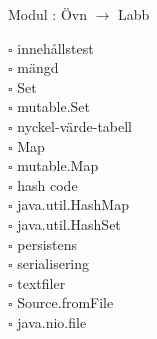 
    Modul : Övn  $\rightarrow$ Labb 
    \begin{multicols}{3}\SlideFontTiny
    $\square$ innehållstest \\
$\square$ mängd \\
$\square$ Set \\
$\square$ mutable.Set \\
$\square$ nyckel-värde-tabell \\
$\square$ Map \\
$\square$ mutable.Map \\
$\square$ hash code \\
$\square$ java.util.HashMap \\
$\square$ java.util.HashSet \\
$\square$ persistens \\
$\square$ serialisering \\
$\square$ textfiler \\
$\square$ Source.fromFile \\
$\square$ java.nio.file \\
    \end{multicols}
    